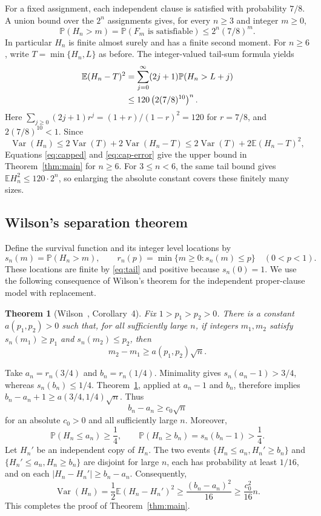 \documentclass[11pt]{article}
\newtheorem{theorem}{Theorem}[section]
\theoremstyle{remark}
\newcommand{\Prb}{\mathbb P}
\newcommand{\E}{\mathbb E}
\newcommand{\Var}{\operatorname{Var}}
\numberwithin{equation}{section}
\begin{document}
For a fixed assignment, each independent clause is satisfied with
probability $7/8$. A union bound over the $2^n$ assignments gives,
for every $n\ge3$ and integer $m\ge0$,
\begin{equation}
 \Prb(H_n>m)=\Prb(F_m\text{ is satisfiable})
          \le2^n(7/8)^m.
 \label{eq:tail}
\end{equation}
In particular $H_n$ is finite almost surely and has a finite second
moment. For $n\ge6$, write $T=\min\{H_n,L\}$ as before. The
integer-valued tail-sum formula yields
\begin{align}
 \E(H_n-T)^2
 &=\sum_{j=0}^\infty(2j+1)\Prb(H_n>L+j)\notag\\
 &\le120\left(2(7/8)^{10}\right)^n.
 \label{eq:cap-error}
\end{align}
Here $\sum_{j\ge0}(2j+1)r^j=(1+r)/(1-r)^2=120$ for $r=7/8$,
and $2(7/8)^{10}<1$. Since
\[
 \Var(H_n)\le2\Var(T)+2\Var(H_n-T)
              \le2\Var(T)+2\E(H_n-T)^2,
\]
Equations \eqref{eq:capped} and \eqref{eq:cap-error} give the upper
bound in Theorem~\ref{thm:main} for $n\ge6$.
For $3\le n<6$, the same tail bound gives
$\E H_n^2\le120\cdot2^n$, so enlarging the absolute constant covers
these finitely many sizes.

\subsection{Wilson's separation theorem}

Define the survival function and its integer level locations by
\[
 s_n(m)=\Prb(H_n>m),\qquad
 r_n(p)=\min\{m\ge0:s_n(m)\le p\}\quad(0<p<1).
\]
These locations are finite by \eqref{eq:tail} and positive because
$s_n(0)=1$. We use the following consequence of Wilson's theorem
for the independent proper-clause model with replacement.

\begin{theorem}[Wilson~\cite{Wilson2002}, Corollary~4]
\label{thm:wilson}
Fix $1>p_1>p_2>0$. There is a constant $a(p_1,p_2)>0$ such that,
for all sufficiently large $n$, if integers $m_1,m_2$ satisfy
$s_n(m_1)\ge p_1$ and $s_n(m_2)\le p_2$, then
\[
 m_2-m_1\ge a(p_1,p_2)\sqrt n.
\]
\end{theorem}

Take $a_n=r_n(3/4)$ and $b_n=r_n(1/4)$. Minimality gives
$s_n(a_n-1)>3/4$, whereas $s_n(b_n)\le1/4$.
Theorem~\ref{thm:wilson}, applied at $a_n-1$ and $b_n$, therefore
implies $b_n-a_n+1\ge a(3/4,1/4)\sqrt n$. Thus
\begin{equation}
 b_n-a_n\ge c_0\sqrt n
 \label{eq:separation}
\end{equation}
for an absolute $c_0>0$ and all sufficiently large $n$.
Moreover,
\[
 \Prb(H_n\le a_n)\ge\frac14,\qquad
 \Prb(H_n\ge b_n)=s_n(b_n-1)>\frac14.
\]
Let $H_n'$ be an independent copy of $H_n$. The two events
$\{H_n\le a_n,H_n'\ge b_n\}$ and
$\{H_n'\le a_n,H_n\ge b_n\}$ are disjoint for large $n$,
each has probability at least $1/16$, and on each
$|H_n-H_n'|\ge b_n-a_n$. Consequently,
\[
 \Var(H_n)=\frac12\E(H_n-H_n')^2
       \ge\frac{(b_n-a_n)^2}{16}\ge\frac{c_0^2}{16}n.
\]
This completes the proof of Theorem~\ref{thm:main}.
\end{document}
